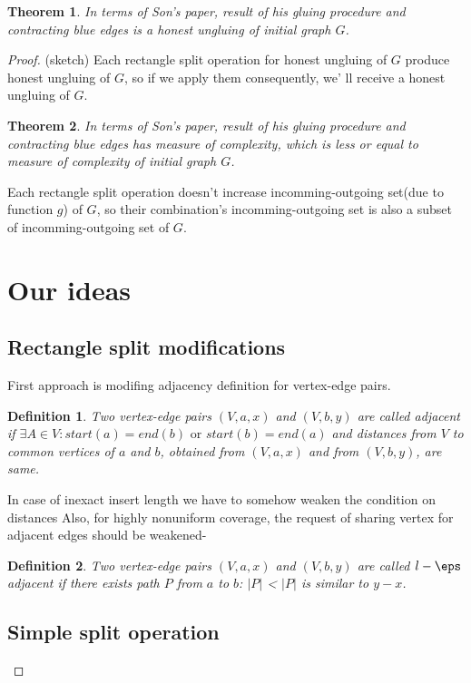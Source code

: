 \documentclass[12pt,a4paper,oneside]{article}
\newtheorem{theorem}{Theorem}
\newtheorem{definition}{Definition}
\begin{document}
\begin{theorem}
  In terms of Son's paper, result of his gluing procedure and contracting blue edges is a honest ungluing of initial graph $G$. 
\end{theorem}
\begin{proof}(sketch)
Each rectangle split operation for honest ungluing of $G$ produce honest ungluing of $G$, so if we apply them consequently, we'
ll receive a honest ungluing of $G$.
\begin{theorem}
  In terms of Son's paper, result of his gluing procedure and contracting blue edges has measure of complexity, which is less or equal to measure of complexity of initial graph $G$. 
\end{theorem}
Each rectangle split operation  doesn't increase incomming-outgoing set(due to function $g$) of $G$, so their combination's incomming-outgoing set is also a subset of incomming-outgoing set of $G$.





\section{Our ideas}
\subsection{Rectangle split modifications}
First approach is modifing adjacency definition for vertex-edge pairs.
\begin{definition}
 Two vertex-edge pairs $(V,a,x)$ and $(V,b,y)$ are called \emph{adjacent} if $\exists A \in V: start (a) = end(b)\text{ or } start(b) = end (a)$ and distances from $V$ to common vertices of $a$ and $b$, obtained from $(V,a,x)$ and from $(V,b,y)$, are same. 
\end{definition}

In case of inexact insert length we have to somehow weaken the condition on distances 
Also, for highly nonuniform coverage, the request of sharing vertex for adjacent edges should be weakened- 

\begin{definition}
 Two vertex-edge pairs $(V,a,x)$ and $(V,b,y)$ are called \emph{$l-\eps$ adjacent} if there exists path $P$ from $a$ to $b$: $|P|$ < $|P|$ is similar to $y-x$. 
\end{definition}

  
\subsection{Simple split operation}


\end{proof}
\end{document}
